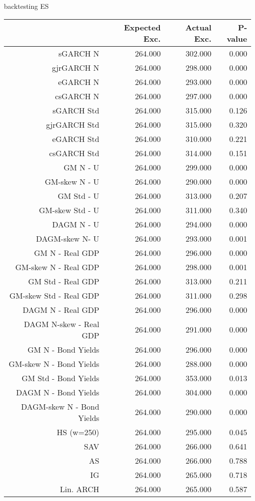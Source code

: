 \documentclass{article}
\begin{document}


\begin{table}[ht]
\centering
backtesting ES\\
\begin{tabular}{rrrr}
  \hline
 & Expected Exc. & Actual Exc. & P-value \\ 
  \hline
sGARCH N & 264.000 & 302.000 & 0.000 \\ 
  gjrGARCH N & 264.000 & 298.000 & 0.000 \\ 
  eGARCH N & 264.000 & 293.000 & 0.000 \\ 
  csGARCH N & 264.000 & 297.000 & 0.000 \\ 
  sGARCH Std & 264.000 & 315.000 & 0.126 \\ 
  gjrGARCH Std & 264.000 & 315.000 & 0.320 \\ 
  eGARCH Std & 264.000 & 310.000 & 0.221 \\ 
  csGARCH Std & 264.000 & 314.000 & 0.151 \\ 
  GM N - U & 264.000 & 299.000 & 0.000 \\ 
  GM-skew N - U & 264.000 & 290.000 & 0.000 \\ 
  GM Std - U & 264.000 & 313.000 & 0.207 \\ 
  GM-skew Std - U & 264.000 & 311.000 & 0.340 \\ 
  DAGM N - U & 264.000 & 294.000 & 0.000 \\ 
  DAGM-skew  N- U & 264.000 & 293.000 & 0.001 \\ 
  GM N - Real GDP & 264.000 & 296.000 & 0.000 \\ 
  GM-skew N - Real GDP & 264.000 & 298.000 & 0.001 \\ 
  GM Std - Real GDP & 264.000 & 313.000 & 0.211 \\ 
  GM-skew Std - Real GDP & 264.000 & 311.000 & 0.298 \\ 
  DAGM N - Real GDP & 264.000 & 296.000 & 0.000 \\ 
  DAGM N-skew - Real GDP & 264.000 & 291.000 & 0.000 \\ 
  GM N - Bond Yields & 264.000 & 296.000 & 0.000 \\ 
  GM-skew N - Bond Yields & 264.000 & 288.000 & 0.000 \\ 
  GM Std - Bond Yields & 264.000 & 353.000 & 0.013 \\ 
  DAGM N - Bond Yields & 264.000 & 304.000 & 0.000 \\ 
  DAGM-skew N - Bond Yields & 264.000 & 290.000 & 0.000 \\ 
  HS (w=250) & 264.000 & 295.000 & 0.045 \\ 
  SAV & 264.000 & 266.000 & 0.641 \\ 
  AS & 264.000 & 266.000 & 0.788 \\ 
  IG & 264.000 & 265.000 & 0.718 \\ 
  Lin. ARCH & 264.000 & 265.000 & 0.587 \\ 
   \hline
\end{tabular}
\end{table}
\end{document}
